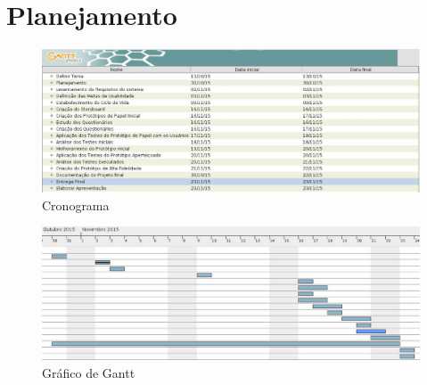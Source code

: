 \chapter[Planejamento]{Planejamento}

\begin{figure}[H]
		\includegraphics[width=.9\textwidth,keepaspectratio,scale=0.5]{figuras/cronograma.eps}
		\caption{Cronograma}
\end{figure}

\begin{figure}[H]
		\includegraphics[width=.9\textwidth,keepaspectratio,scale=0.5]{figuras/cronograma_gafico_gantt.eps}
		\caption{Gráfico de Gantt}
\end{figure}